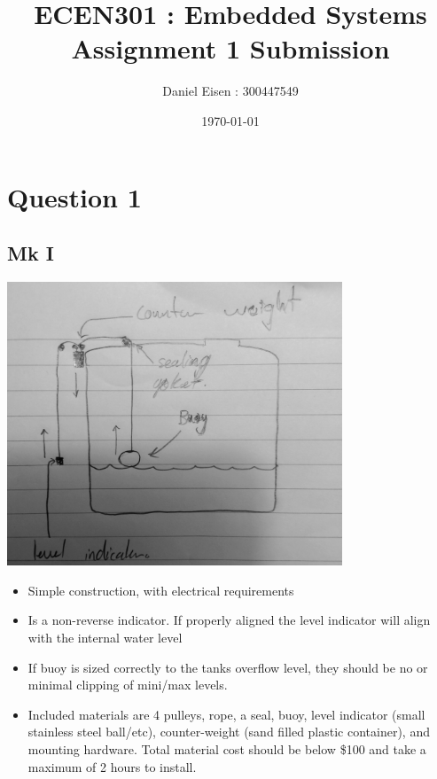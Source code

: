 \documentclass[11pt]{article}
\title{ECEN301 : Embedded Systems \\ Assignment 1 Submission}
\author{Daniel Eisen : 300447549}
\date{\today}
\begin{document}
\maketitle
\section*{Question 1}
\subsection*{Mk I}
\begin{center}
        \includegraphics[width=0.75\textwidth]{mk1.jpg}
\end{center}
\begin{itemize}
        \item Simple construction, with electrical requirements
        \item Is a non-reverse indicator. If properly aligned the level indicator will align with the internal water level
        \item If buoy is sized correctly to the tanks overflow level, they should be no or minimal clipping of mini/max levels.
        \item Included materials are 4 pulleys, rope, a seal, buoy, level indicator (small stainless steel ball/etc), counter-weight (sand filled plastic container), and mounting hardware. Total material cost should be below \$100 and take a maximum of 2 hours to install.  
\end{itemize}
\end{document}

